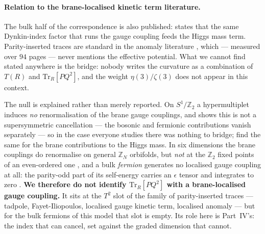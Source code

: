 \documentclass[11pt,a4paper]{article}
\newcommand{\ZZ}{\mathbb{Z}}
\begin{document}
\paragraph{Relation to the brane-localised kinetic term literature.} The bulk half of the
correspondence is also published: \cite{CCP06} states that the same Dynkin-index factor that runs
the gauge coupling feeds the Higgs mass term. Parity-inserted traces are standard in the anomaly
literature \cite{vGQ03,SS04}, which --- measured over $94$ pages --- never mentions the effective
potential. What we cannot find stated anywhere is the bridge: nobody writes the curvature as a
combination of $T(R)$ and $\mathrm{Tr}_R[P Q^2]$, and the weight $\eta(3)/\zeta(3)$ does not appear
in this context.

The null is explained rather than merely reported. On $S^1/\ZZ_2$ a hypermultiplet induces
\emph{no} renormalisation of the brane gauge couplings, and \cite{GNH05} shows this is not a
supersymmetric cancellation --- the bosonic and fermionic contributions vanish separately --- so in
the case everyone studies there was nothing to bridge; \cite{vGIQ} find the same for the brane
contributions to the Higgs mass. In six dimensions the brane couplings do renormalise on general
$\ZZ_N$ orbifolds, but \emph{not} at the $\ZZ_2$ fixed points of an even-ordered one \cite{GNH05},
and a bulk \emph{fermion} generates no localised gauge coupling at all: the parity-odd part of its
self-energy carries an $\epsilon$ tensor and integrates to zero \cite{GLS06}. \textbf{We therefore
do not identify $\mathrm{Tr}_R[P Q^2]$ with a brane-localised gauge coupling.} It sits at the $T^2$
slot of the family of parity-inserted traces --- tadpole, Fayet-Iliopoulos, localised gauge kinetic
term, localised anomaly --- but for the bulk fermions of this model that slot is empty. Its role
here is Part~IV's: the index that can cancel, set against the graded dimension that cannot.
\end{document}
